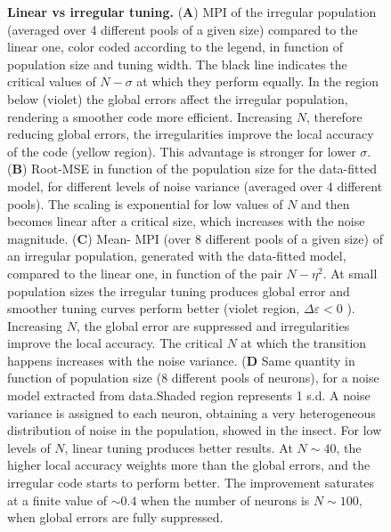 \documentclass[a4paper]{article}
\begin{document}
\clearpage
\begin{figure}
\centering
{}
\caption{\textbf{Linear vs irregular tuning.}  (\textbf{A}) MPI of the irregular population (averaged over 4 different pools of a given size) compared to the linear one, color coded according to the legend, in function of population size and tuning width. The black line indicates the critical values of $N-\sigma$ at which they perform equally. In the region below (violet) the global errors affect the irregular population, rendering a smoother code more efficient. Increasing $N$, therefore reducing global errors, the irregularities improve the local accuracy of the code (yellow region). This advantage is stronger for lower $\sigma$.
(\textbf{B}) Root-MSE in function of the population size for the data-fitted model, for different levels of noise variance (averaged over 4 different pools). The scaling is exponential for low values of $N$ and then becomes linear after a critical size, which increases with the noise magnitude. (\textbf{C}) Mean- MPI (over 8 different pools of a given size) of an irregular population, generated with the data-fitted model, compared to the linear one, in function of the pair $N-\eta^2$.   At small population sizes the irregular tuning produces global error and smoother tuning curves perform better (violet region, $\Delta \varepsilon <0 $ ). Increasing $N$, the global error are suppressed and irregularities improve the local accuracy. The critical $N$ at which the transition happens increases with the noise variance. (\textbf{D} Same quantity in function of population size (8 different pools of neurons), for a noise model extracted from data.Shaded region represents 1 s.d. A noise variance is assigned to each neuron, obtaining a very heterogeneous distribution of noise in the population, showed in the insect.  For low levels of $N$, linear tuning produces better results. At $N\sim 40$, the higher local accuracy weights more than the global errors, and the irregular code starts to perform better. The improvement saturates at a finite value of $ \sim 0.4$ when the number of neurons is $N\sim 100$, when global errors are fully suppressed. }
\label{Fig:6}
\end{figure}
\clearpage
\end{document}
